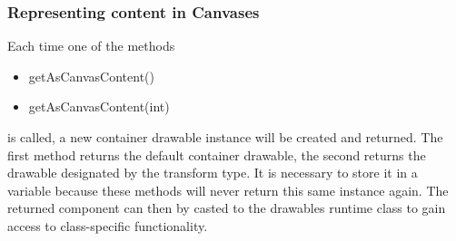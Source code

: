   \subsubsection{Representing content in Canvases}
    Each time one of the methods
     \begin{itemize}
      \item getAsCanvasContent()
      \item getAsCanvasContent(int)
    \end{itemize}
    is called, a new container drawable instance will be created and returned. The first
    method returns the default container drawable, the second returns the drawable designated
    by the transform type. It is necessary to store it in a variable because these
    methods will never return this same instance again. The returned component can
    then by casted to the drawables runtime class to gain access to class-specific 
    functionality.
    
